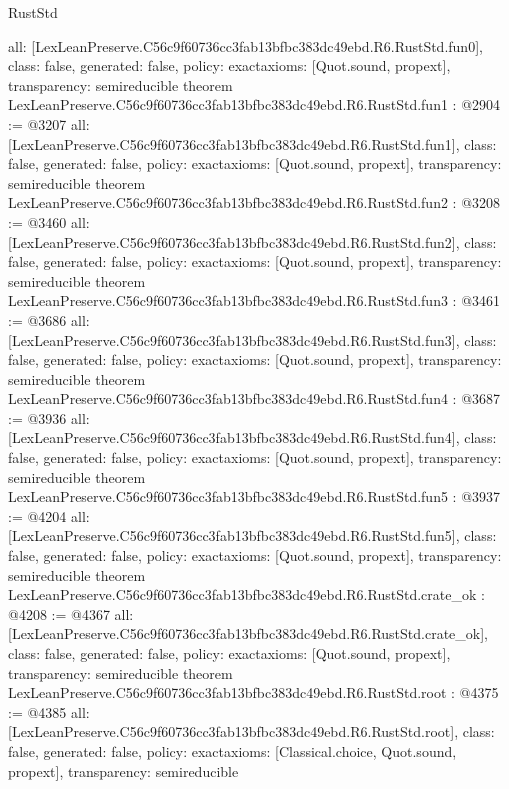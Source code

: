 \begin{lexlean}{RustStd}
\begin{coremodule}
{  all: [LexLeanPreserve.C56c9f60736cc3fab13bfbc383dc49ebd.R6.RustStd.fun0],
  class: false,
  generated: false,
  policy: exact{axioms: [Quot.sound, propext]},
  transparency: semireducible
}
theorem LexLeanPreserve.C56c9f60736cc3fab13bfbc383dc49ebd.R6.RustStd.fun1 : @2904 := @3207 {
  all: [LexLeanPreserve.C56c9f60736cc3fab13bfbc383dc49ebd.R6.RustStd.fun1],
  class: false,
  generated: false,
  policy: exact{axioms: [Quot.sound, propext]},
  transparency: semireducible
}
theorem LexLeanPreserve.C56c9f60736cc3fab13bfbc383dc49ebd.R6.RustStd.fun2 : @3208 := @3460 {
  all: [LexLeanPreserve.C56c9f60736cc3fab13bfbc383dc49ebd.R6.RustStd.fun2],
  class: false,
  generated: false,
  policy: exact{axioms: [Quot.sound, propext]},
  transparency: semireducible
}
theorem LexLeanPreserve.C56c9f60736cc3fab13bfbc383dc49ebd.R6.RustStd.fun3 : @3461 := @3686 {
  all: [LexLeanPreserve.C56c9f60736cc3fab13bfbc383dc49ebd.R6.RustStd.fun3],
  class: false,
  generated: false,
  policy: exact{axioms: [Quot.sound, propext]},
  transparency: semireducible
}
theorem LexLeanPreserve.C56c9f60736cc3fab13bfbc383dc49ebd.R6.RustStd.fun4 : @3687 := @3936 {
  all: [LexLeanPreserve.C56c9f60736cc3fab13bfbc383dc49ebd.R6.RustStd.fun4],
  class: false,
  generated: false,
  policy: exact{axioms: [Quot.sound, propext]},
  transparency: semireducible
}
theorem LexLeanPreserve.C56c9f60736cc3fab13bfbc383dc49ebd.R6.RustStd.fun5 : @3937 := @4204 {
  all: [LexLeanPreserve.C56c9f60736cc3fab13bfbc383dc49ebd.R6.RustStd.fun5],
  class: false,
  generated: false,
  policy: exact{axioms: [Quot.sound, propext]},
  transparency: semireducible
}
theorem LexLeanPreserve.C56c9f60736cc3fab13bfbc383dc49ebd.R6.RustStd.crate_ok : @4208 := @4367 {
  all: [LexLeanPreserve.C56c9f60736cc3fab13bfbc383dc49ebd.R6.RustStd.crate_ok],
  class: false,
  generated: false,
  policy: exact{axioms: [Quot.sound, propext]},
  transparency: semireducible
}
theorem LexLeanPreserve.C56c9f60736cc3fab13bfbc383dc49ebd.R6.RustStd.root : @4375 := @4385 {
  all: [LexLeanPreserve.C56c9f60736cc3fab13bfbc383dc49ebd.R6.RustStd.root],
  class: false,
  generated: false,
  policy: exact{axioms: [Classical.choice, Quot.sound, propext]},
  transparency: semireducible
}


\end{coremodule}
\end{lexlean}
